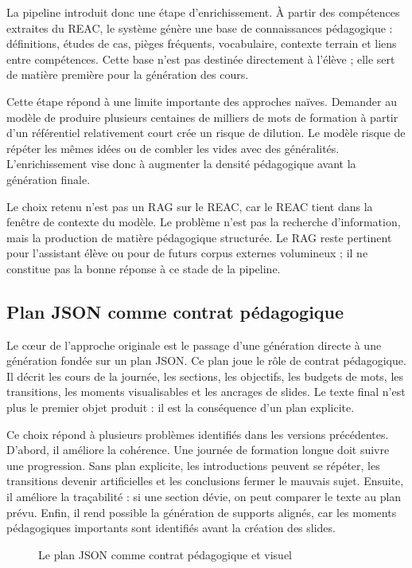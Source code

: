 \documentclass[12pt,a4paper]{article}
\begin{document}
La pipeline introduit donc une étape d'enrichissement. À partir des compétences extraites
du REAC, le système génère une base de connaissances pédagogique : définitions, études
de cas, pièges fréquents, vocabulaire, contexte terrain et liens entre compétences. Cette
base n'est pas destinée directement à l'élève ; elle sert de matière première pour la
génération des cours.

Cette étape répond à une limite importante des approches naïves. Demander au modèle
de produire plusieurs centaines de milliers de mots de formation à partir d'un référentiel
relativement court crée un risque de dilution. Le modèle risque de répéter les mêmes
idées ou de combler les vides avec des généralités. L'enrichissement vise donc à augmenter
la densité pédagogique avant la génération finale.

Le choix retenu n'est pas un RAG sur le REAC, car le REAC tient dans la fenêtre de
contexte du modèle. Le problème n'est pas la recherche d'information, mais la production
de matière pédagogique structurée. Le RAG reste pertinent pour l'assistant élève ou pour
de futurs corpus externes volumineux ; il ne constitue pas la bonne réponse à ce stade de
la pipeline.

\subsection{Plan JSON comme contrat pédagogique}

Le cœur de l'approche originale est le passage d'une génération directe à une génération
fondée sur un plan JSON. Ce plan joue le rôle de contrat pédagogique. Il décrit les cours
de la journée, les sections, les objectifs, les budgets de mots, les transitions, les moments
visualisables et les ancrages de slides. Le texte final n'est plus le premier objet produit :
il est la conséquence d'un plan explicite.

Ce choix répond à plusieurs problèmes identifiés dans les versions précédentes. D'abord,
il améliore la cohérence. Une journée de formation longue doit suivre une progression.
Sans plan explicite, les introductions peuvent se répéter, les transitions devenir
artificielles et les conclusions fermer le mauvais sujet. Ensuite, il améliore la traçabilité :
si une section dévie, on peut comparer le texte au plan prévu. Enfin, il rend possible la
génération de supports alignés, car les moments pédagogiques importants sont identifiés
avant la création des slides.

\begin{figure}[h]
\centering
{}
\caption{Le plan JSON comme contrat pédagogique et visuel}
\end{figure}
\end{document}
